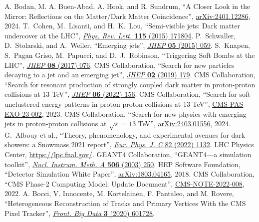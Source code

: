 \begin{thebibliography}{99}
 A. Bodan, M. A. Buen-Abad, A. Hook, and R. Sundrum, ``A Closer Look in the Mirror: Reflections on the Matter/Dark Matter Coincidence'', \href{https://arxiv.org/abs/2401.12286}{arXiv:2401.12286}, 2024.
 T.~Cohen, M.~Lisanti, and H.~K.~Lou, ``Semi-visible jets: Dark matter undercover at the {LHC}'', \href{https://doi.org/10.1103/PhysRevLett.115.171804}{\textit{Phys. Rev. Lett.} \textbf{115} (2015) 171804}.
 P.~Schwaller, D.~Stolarski, and A.~Weiler, ``Emerging jets'', \href{http://dx.doi.org/10.1007/JHEP05(2015)059}{\textit{JHEP} \textbf{05} (2015) 059}.
 S.~Knapen, S.~Pagan Griso, M.~Papucci, and D.~J.~Robinson, ``Triggering Soft Bombs at the LHC'', \href{http://dx.doi.org/10.1007/JHEP08(2017)076}{\textit{JHEP} \textbf{08} (2017) 076}.
 CMS Collaboration, ``Search for new particles decaying to a jet and an emerging jet'', \href{https://doi.org/10.1007/JHEP02(2019)179}{\textit{JHEP} \textbf{02} (2019) 179}.
 CMS Collaboration, ``Search for resonant production of strongly coupled dark matter in proton-proton collisions at 13 TeV'', \href{https://doi.org/10.1007/JHEP06(2022)156}{\textit{JHEP} \textbf{06} (2022) 156}.
 CMS Collaboration, ``Search for soft unclustered energy patterns in proton-proton collisions at 13 TeV'', \href{http://cds.cern.ch/record/2883117}{CMS PAS EXO-23-002}, 2023.
 CMS Collaboration, ``Search for new physics with emerging jets in proton-proton collisions at $\sqrt{s}=13$ TeV'', \href{https://arxiv.org/abs/2403.01556}{arXiv:2403.01556}, 2024.
 G.~Albouy et al., ``Theory, phenomenology, and experimental avenues for dark showers: a Snowmass 2021 report'', \href{https://doi.org/10.1140/epjc/s10052-022-11048-8}{\textit{Eur. Phys. J. C} 82 (2022) 1132}.
 LHC Physics Center, \href{https://lpc.fnal.gov/}{https://lpc.fnal.gov/}.
 {GEANT4} Collaboration, ``{GEANT4}---a simulation toolkit'', \href{http://dx.doi.org/10.1016/S0168-9002(03)01368-8}{\textit{Nucl. Instrum. Meth. A} \textbf{506} (2003) 250}.
 HEP Software Foundation, ``Detector Simulation White Paper'', \href{https://arxiv.org/abs/1803.04165}{arXiv:1803.04165}, 2018.
 CMS Collaboration, ``CMS Phase-2 Computing Model: Update Document'', \href{https://cds.cern.ch/record/2815292}{CMS-NOTE-2022-008}, 2022.
 A. Bocci, V. Innocente, M. Kortelainen, F. Pantaleo, and M. Rovere, ``Heterogeneous Reconstruction of Tracks and Primary Vertices With the CMS Pixel Tracker'', \href{https://doi.org/10.3389/fdata.2020.601728}{\textit{Front. Big Data} \textbf{3} (2020) 601728}.

\end{thebibliography}
